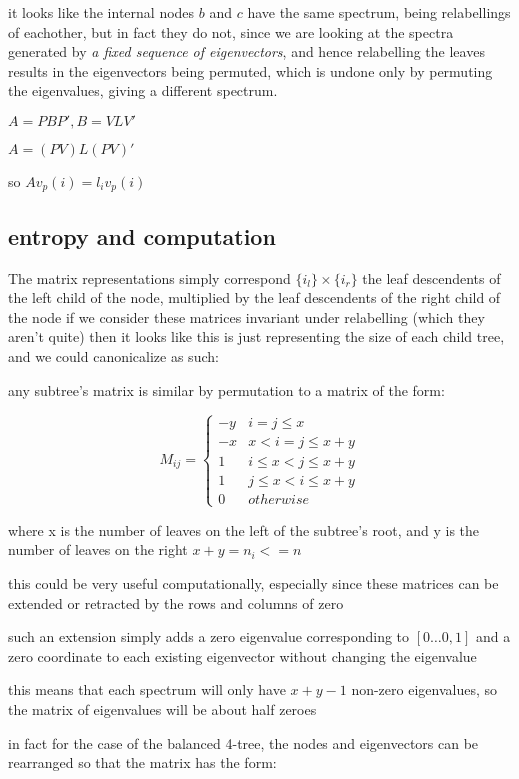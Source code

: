 \documentclass{report}
\begin{document}
it looks like the internal nodes $b$ and $c$ have the same spectrum, being
relabellings of eachother, but in fact they do not, since we are looking at
the spectra generated by \emph{a fixed sequence of eigenvectors}, and hence
relabelling the leaves results in the eigenvectors being permuted, which is
undone only by permuting the eigenvalues, giving a different spectrum.

$A = PBP', B = VLV'$

$A = (PV)L(PV)'$

so $A v_p(i) = l_i v_p(i)$



\subsection{entropy and computation}

The matrix representations simply correspond $\{i_l\} \times \{i_r\}$
the leaf descendents of the left child of the node,
multiplied by the leaf descendents of the right child of the node
if we consider these matrices invariant under relabelling (which they aren't
quite) then it looks like this is just representing the size of each child
tree, and we could canonicalize as such:

any subtree's matrix is similar by permutation to a matrix of the form:

\[ M_{ij} = \begin{cases}
-y & i = j \leq x\\
-x & x < i = j \leq x + y\\
1 & i \leq x < j \leq x + y\\
1 & j \leq x < i \leq x + y\\
0 & otherwise
\end{cases}
\]

where x is the number of leaves on the left of the subtree's root,
and y is the number of leaves on the right
$x + y = n_i <= n$

this could be very useful computationally, especially since these matrices can
be extended or retracted by the rows and columns of zero

such an extension simply adds a zero eigenvalue corresponding to
$[0\ldots 0, 1]$
and a zero coordinate to each existing eigenvector without changing the
eigenvalue

this means that each spectrum will only have $x + y - 1$ non-zero eigenvalues,
so the matrix of eigenvalues will be about half zeroes

in fact for the case of the balanced 4-tree, the nodes and eigenvectors can be
rearranged so that the matrix has the form:
\end{document}
